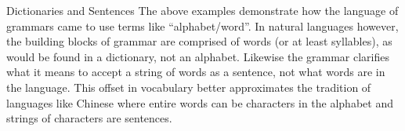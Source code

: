 \begin{remark}{Dictionaries and Sentences}
    The above examples demonstrate how the language of grammars came to 
    use terms like ``alphabet/word''. 
    In natural languages however, the building blocks of grammar are comprised of words (or
    at least syllables), as would be found in a dictionary, not an alphabet.  
    Likewise the grammar clarifies what it means to accept a string of words as a sentence,
    not what words are in the language. This offset in vocabulary better 
    approximates the tradition of languages like Chinese
    where entire words can be characters in the alphabet and strings of
    characters are sentences.
\end{remark}
